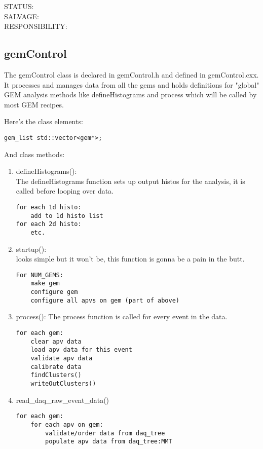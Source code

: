 \documentclass[11pt]{article}
\newcommand{\featureFooter}{
\noindent
STATUS: \\
SALVAGE:\\
RESPONSIBILITY:}
\begin{document}
	\featureFooter
	
	\subsection{gemControl}
	The gemControl class is declared in gemControl.h and defined in gemControl.cxx. It processes and manages data from all the gems and holds definitions for "global" GEM analysis methods like defineHistograms and process which will be called by most GEM recipes. 
		
	Here's the class elements:
	\begin{lstlisting} 
gem_list std::vector<gem*>; 

	\end{lstlisting}
	
	And class methods:
	\begin{enumerate}
		\item defineHistograms():
		\\The defineHistograms function sets up output histos for the analysis, it is called before looping over data.
		\begin{lstlisting}
for each 1d histo:
	add to 1d histo list
for each 2d histo:
	etc.
		\end{lstlisting}
		
		\item startup():\\
		looks simple but it won't be, this function is gonna be a pain in the butt.
		\begin{lstlisting}
For NUM_GEMS:
	make gem
	configure gem 
	configure all apvs on gem (part of above)
		\end{lstlisting}
		
		\item process(): 
		The process function is called for every event in the data. 
		\begin{lstlisting}
for each gem:
	clear apv data
	load apv data for this event
	validate apv data
	calibrate data
	findClusters()
	writeOutClusters()			
		\end{lstlisting}
		
		\item read\_daq\_raw\_event\_data()
		\begin{lstlisting}
for each gem:
	for each apv on gem:
		validate/order data from daq_tree	
		populate apv data from daq_tree:MMT
		\end{lstlisting}
		
	\end{enumerate}
	
\end{document}
